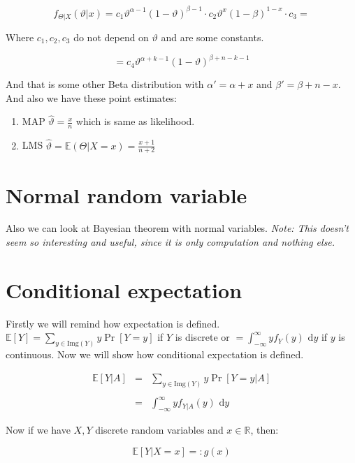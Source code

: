 $$
f_{\Theta \vert X}(\vartheta \vert x) = c_{1} \vartheta^{\alpha - 1}(1 - \vartheta)^{\beta - 1} \cdot c_{2} \vartheta^{x} (1- \beta)^{1-x} \cdot c_{3} =
$$

Where $c_{1},c_{2},c_{3}$ do not depend on $\vartheta$ and are some constants.

$$
= c_{4} \vartheta^{\alpha + k -1}(1 - \vartheta)^{\beta + n - k -1}
$$

And that is some other Beta distribution with $\alpha' = \alpha + x$ and $\beta' = \beta + n - x$. And also we have these point estimates:

\begin{enumerate}
	\item MAP $\hat{\vartheta} = \frac{x}{n}$ which is same as likelihood.
	\item LMS $\hat{\vartheta} = \mathbb{E}(\Theta \vert X = x) = \frac{x+1}{n+2}$
\end{enumerate}

\section{Normal random variable}

Also we can look at Bayesian theorem with normal variables. \textit{Note: This doesn't seem so interesting and useful, since it is only computation and nothing else.}


\section{Conditional expectation}

Firstly we will remind how expectation is defined. $\mathbb{E}[Y] = \sum_{y \in \text{Img}(Y)} y \Pr[Y = y]$ if $Y$ is discrete or $= \int_{-\infty}^{\infty} y f_{Y}(y) \text{ d}y$ if $y$ is continuous. Now we will show how conditional expectation is defined.

$$
\begin{array}{rcl}
\mathbb{E}[Y \vert A] & = & \sum_{y \in \text{Img}(Y)}y \Pr[Y = y \vert A] \\ \\
& = & \int_{-\infty}^{\infty} y f_{Y \vert A}(y) \text{ d}y
\end{array}
$$

Now if we have $X,Y$ discrete random variables and $x \in \mathbb{R}$, then:

$$
\mathbb{E}[Y \vert X = x] =: g(x)
$$

